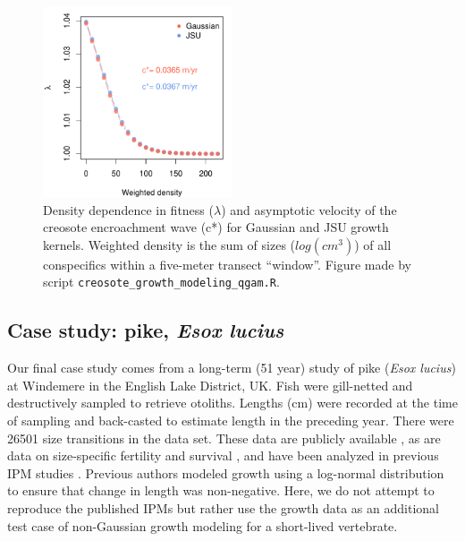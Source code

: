 \documentclass[12pt]{article}
\begin{document}
\begin{spacing}{1.35}
\begin{figure}[tbp]
	\centering
	\includegraphics[width=0.5\textwidth]{figures/creosote_DD_lambda.pdf}
	\caption{Density dependence in fitness ($\lambda$) and asymptotic velocity of the creosote encroachment wave (c*) for Gaussian and JSU growth kernels. Weighted density is the sum of sizes ($log(cm^3)$) of all conspecifics within a five-meter transect ``window''. Figure made by script \texttt{creosote\_growth\_modeling\_qgam.R}.}
	\label{fig:creosote_lambda_cstar}
\end{figure}

\subsection{Case study: pike, \emph{Esox lucius}}
\label{sec:pike}
Our final case study comes from a long-term (51 year) study of pike (\emph{Esox lucius}) at Windemere in the English Lake District, UK. 
Fish were gill-netted and destructively sampled to retrieve otoliths. 
Lengths (cm) were recorded at the time of sampling and back-casted to estimate length in the preceding year. 
There were 26501 size transitions in the data set. 
These data are publicly available \citep{winfield2013pikegrowth}, as are data on size-specific fertility and survival \citep{winfield2013pikesurvival,winfield2013pikefecundity}, and have been analyzed in previous IPM studies \citep{vindenes2014effects,stubberud2019effects}. 
Previous authors modeled growth using a log-normal distribution to ensure that change in length was non-negative. 
Here, we do not attempt to reproduce the published IPMs but rather use the growth data as an additional test case of non-Gaussian growth modeling for a short-lived vertebrate. 


\end{spacing}
\end{document}

